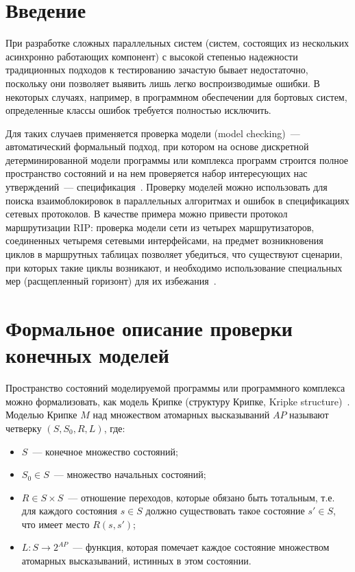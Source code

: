 \documentclass[12pt,a4paper,fleqn]{article}
\begin{document}
\section{Введение}
\label{sec:intro}

При разработке сложных параллельных систем (систем, состоящих из нескольких асинхронно работающих компонент) с высокой
степенью надежности традиционных подходов к тестированию зачастую бывает недостаточно, поскольку они позволяет выявить
лишь легко воспроизводимые ошибки. В некоторых случаях, например, в программном обеспечении для бортовых систем,
определенные классы ошибок требуется полностью исключить.

Для таких случаев применяется проверка модели (model checking)~--- автоматический формальный подход, при котором на основе
дискретной детерминированной модели программы или комплекса программ строится полное пространство состояний и на нем
проверяется набор интересующих нас утверждений~--- спецификация~\cite{Clarke}. Проверку моделей можно использовать для
поиска взаимоблокировок в параллельных алгоритмах и ошибок в спецификациях сетевых протоколов. В качестве примера можно
привести протокол маршрутизации RIP: проверка модели сети из четырех маршрутизаторов, соединенных четыремя сетевыми
интерфейсами, на предмет возникновения циклов в маршрутных таблицах позволяет убедиться, что существуют сценарии, при
которых такие циклы возникают, и необходимо использование специальных мер (расщепленный горизонт) для их
избежания~\cite{RipOnSpin}.

\section{Формальное описание проверки конечных моделей}
\label{sec:modelchecking}

Пространство состояний моделируемой программы или программного комплекса можно формализовать, как модель Крипке
(структуру Крипке, Kripke structure)~\cite{Clarke}. Моделью Крипке $M$ над множеством атомарных высказываний $AP$
называют четверку $(S, S_0, R, L)$, где:

\begin{itemize}
\item $S$~--- конечное множество состояний;
\item $S_0 \in S$~--- множество начальных состояний;
\item $R \in S \times S$~--- отношение переходов, которые обязано быть тотальным, т.е. для каждого состояния $s \in S$
  должно существовать такое состояние $s' \in S$, что имеет место $R(s, s')$;
\item $L\colon S \rightarrow 2^{AP}$~--- функция, которая помечает каждое состояние множеством  атомарных высказываний, истинных в этом состоянии.
\end{itemize}
\end{document}
